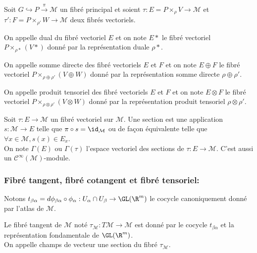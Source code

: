 Soit $G \hookrightarrow P \overset{\pi}{\to} \mathcal{M}$ un fibré principal et soient $\tau : E = P\times_\rho V \to \mathcal{M}$ et $\tau' : F = P\times_{\rho'} W  \to \mathcal{M}$ deux fibrés vectoriels. \\

\begin{defi}
On appelle dual du fibré vectoriel $E$ et on note $E*$ le fibré vectoriel $P \times_{\rho*} (V*)$ donné par la représentation duale $\rho*$.
\end{defi}

\begin{defi}
On appelle somme directe des fibré vectoriels $E$ et $F$ et on note $E\oplus F$ le fibré vectoriel $P \times_{\rho \oplus \rho'} (V\oplus W)$ donné par la représentation somme directe $\rho \oplus \rho'$.
\end{defi}

\begin{defi}
On appelle produit tensoriel des fibré vectoriels $E$ et $F$ et on note $E\otimes F$ le fibré vectoriel $P \times_{\rho \otimes \rho'} (V\otimes W)$ donné par la représentation produit tensoriel $\rho \otimes \rho'$.
\end{defi}

\begin{defi}[Section]
Soit $\tau: E \to \mathcal{M}$ un fibré vectoriel sur $\mathcal{M}$. Une section est une application $s:\mathcal{M} \to E$ telle que $\pi \circ s = \id_\mathcal{M}$ ou de façon équivalente telle que $\forall x\in \mathcal{M}, s(x) \in E_x$. \\
On note $\Gamma(E)$ ou $\Gamma(\tau)$ l'espace vectoriel des sections de $\tau: E \to \mathcal{M}$. C'est aussi un $\mathscr{C}^\infty(\mathcal{M})$-module.
\end{defi}

\subsubsection{Fibré tangent, fibré cotangent et fibré tensoriel:}

Notons $t_{\beta\alpha} = d\phi_{\beta\alpha} \circ \phi_\alpha : U_\alpha \cap U_\beta \to \GL(\R^m)$ le cocycle canoniquement donné par l'atlas de $\mathcal{M}$.

\begin{defi}
Le fibré tangent de $\mathcal{M}$ noté $\tau_\mathcal{M} : T\mathcal{M} \to \mathcal{M}$ est donné par le cocycle $t_{\beta\alpha}$ et la représentation fondamentale de $\GL(\R^m)$. \\
On appelle champs de vecteur une section du fibré $\tau_\mathcal{M}$.
\end{defi}

